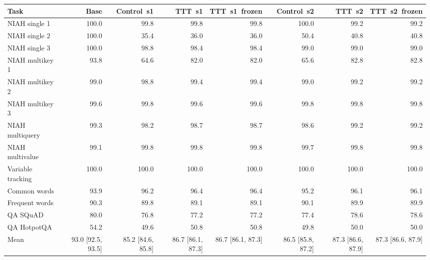 \begin{tabular}{lrrrrrrr}
\toprule
Task & Base & Control~s1 & TTT~s1 & TTT~s1~frozen & Control~s2 & TTT~s2 & TTT~s2~frozen \\
\midrule
NIAH single 1 & 100.0 & 99.8 & 99.8 & 99.8 & 100.0 & 99.2 & 99.2 \\
NIAH single 2 & 100.0 & 35.4 & 36.0 & 36.0 & 50.4 & 40.8 & 40.8 \\
NIAH single 3 & 100.0 & 98.8 & 98.4 & 98.4 & 99.0 & 99.0 & 99.0 \\
NIAH multikey 1 & 93.8 & 64.6 & 82.0 & 82.0 & 65.6 & 82.8 & 82.8 \\
NIAH multikey 2 & 99.0 & 98.8 & 99.4 & 99.4 & 99.0 & 99.2 & 99.2 \\
NIAH multikey 3 & 99.6 & 99.8 & 99.6 & 99.6 & 99.8 & 99.8 & 99.8 \\
NIAH multiquery & 99.3 & 98.2 & 98.7 & 98.7 & 98.6 & 99.2 & 99.2 \\
NIAH multivalue & 99.1 & 99.8 & 99.8 & 99.8 & 99.7 & 99.8 & 99.8 \\
Variable tracking & 100.0 & 100.0 & 100.0 & 100.0 & 100.0 & 100.0 & 100.0 \\
Common words & 93.9 & 96.2 & 96.4 & 96.4 & 95.2 & 96.1 & 96.1 \\
Frequent words & 90.3 & 89.8 & 89.1 & 89.1 & 90.1 & 89.9 & 89.9 \\
QA SQuAD & 80.0 & 76.8 & 77.2 & 77.2 & 77.4 & 78.6 & 78.6 \\
QA HotpotQA & 54.2 & 49.6 & 50.8 & 50.8 & 49.8 & 50.0 & 50.0 \\
\midrule
Mean & 93.0 [92.5, 93.5] & 85.2 [84.6, 85.8] & 86.7 [86.1, 87.3] & 86.7 [86.1, 87.3] & 86.5 [85.8, 87.2] & 87.3 [86.6, 87.9] & 87.3 [86.6, 87.9] \\
\bottomrule
\end{tabular}
